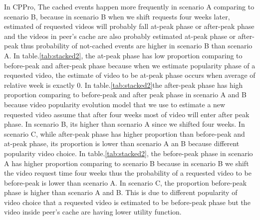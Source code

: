 \documentclass[10pt,final,journal,a4paper]{IEEEtran}
\begin{document}

In CPPro, The cached events happen more frequently in scenario A comparing to scenario B, because in scenario B when we shift requests four weeks later, estimated of requested videos will probably fall at-peak phase or after-peak phase and the videos in peer's cache are also probably estimated at-peak phase or after-peak thus probability of not-cached events are higher in scenario B than scenario A.
In table.\ref{tab:stacked2}, the at-peak phase has low proportion comparing to before-peak and after-peak phase because when we estimate popularity phase of a requested video, the estimate of video to be at-peak phase occurs when average of relative week is exactly $0$. 
In table.\ref{tab:stacked2}the after-peak phase has high proportion comparing to before-peak and after peak phase in scenario A and B because video popularity evolution model that we use to estimate a new requested video assume that after four weeks most of video will enter after peak phase. 
In scenario B, its higher than scenario A since we shifted four weeks. 
In scenario C, while after-peak phase has higher proportion than before-peak and at-peak phase, its proportion is lower than scenario A an B because different popularity video choice.
In table.\ref{tab:stacked2}, the before-peak phase in scenario A has higher proportion comparing to scenario B because in scenario B we shift the video request time four weeks thus the probability of a requested video to be before-peak is lower than scenario A. 
In scenario C, the proportion before-peak phase is higher than scenario A and B. 
This is due to different popularity of video choice that a requested video is estimated to be before-peak phase but the video inside peer's cache are having lower utility function.
\end{document}
